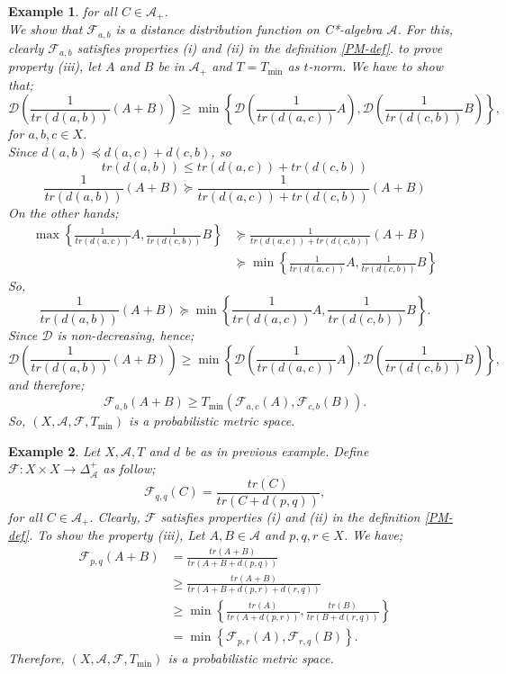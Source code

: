 \documentclass{amsart}%
\theoremstyle{plain}
\newtheorem{example}{Example}
\numberwithin{equation}{section}
\begin{document}
\begin{example}
	for all $C\in \mathcal{A}_+$.\\
	We show that $\mathcal{F}_{a,b}$ is a distance distribution function on C*-algebra $\mathcal{A}$. For this, clearly $\mathcal{F}_{a,b}$ satisfies properties (i) and (ii) in the definition \ref{PM-def}. to prove property (iii), let $A$ and $B$ be in $\mathcal{A}_+$ and $T=T_{\min}$ as $t$-norm. We have to show that;
	$$\mathcal{D}\left( \frac{1}{tr\left(d(a,b)\right)}(A+B)\right) \geq \min \left\{\mathcal{D}\left( \frac{1}{tr\left(d(a,c)\right)}A\right) , \mathcal{D}\left( \frac{1}{tr\left(d(c,b)\right)}B \right)\right\},  $$
	for $a,b,c\in X$.\\
	Since $d(a,b)\preceq d(a,c)+d(c,b)$, so
	$$tr\left( d(a,b)\right) \leq tr\left( d(a,c)\right) +tr\left( d(c,b)\right) $$
	$$\frac{1}{tr\left(d(a,b)\right)}(A+B)\succeq \frac{1}{tr\left( d(a,c)\right) +tr\left( d(c,b)\right)}(A+B)$$
	On the other hands;
	\begin{align*}
		\max\left\{\frac{1}{tr\left(d(a,c)\right)}A, \frac{1}{tr\left(d(c,b)\right)}B\right\} &\succeq \frac{1}{tr\left( d(a,c)\right) +tr\left( d(c,b)\right)}(A+B)\\
		&\succeq \min \left\{\frac{1}{tr\left(d(a,c)\right)}A, \frac{1}{tr\left(d(c,b)\right)}B\right\}
	\end{align*}
	So, 
	$$\frac{1}{tr\left(d(a,b)\right)}(A+B)\succeq \min \left\{\frac{1}{tr\left(d(a,c)\right)}A, \frac{1}{tr\left(d(c,b)\right)}B\right\}.$$
	Since $\mathcal{D}$ is non-decreasing, hence;
	$$\mathcal{D}\left( \frac{1}{tr\left(d(a,b)\right)}(A+B)\right) \geq \min \left\{\mathcal{D}\left( \frac{1}{tr\left(d(a,c)\right)}A\right) , \mathcal{D}\left( \frac{1}{tr\left(d(c,b)\right)}B \right)\right\}, $$
	and therefore;
	$$\mathcal{F}_{a,b}(A+B)\geq T_{\min}\left(\mathcal{F}_{a,c}(A),\mathcal{F}_{c,b}(B) \right).$$
	So, $(X, \mathcal{A}, \mathcal{F}, T_{\min})$ is a probabilistic metric space.
\end{example}

\begin{example}\label{Ex3}
	Let $X, \mathcal{A}, T$ and $d$ be as in previous example. Define $\mathcal{F}:X\times X \to \Delta^+_{\mathcal{A}}$ as follow;
	$$\mathcal{F}_{q,q}(C)=\frac{tr(C)}{tr\left( C+d(p,q)\right) },$$
	for all $C\in \mathcal{A}_+$.
	Clearly, $\mathcal{F}$ satisfies properties (i) and (ii) in the definition \ref{PM-def}. To show the property (iii), Let $A, B \in \mathcal{A}$ and $p, q, r \in X$. We have;
	\begin{align*}
		\mathcal{F}_{p,q}(A+B)&=\frac{tr(A+B)}{tr\left( A+B+d(p,q)\right)}\\
		&\geq \frac{tr(A+B)}{tr\left( A+B+d(p,r)+d(r,q)\right)}\\
		&\geq \min\left\{\frac{tr(A)}{tr\left( A+d(p,r)\right)}, \frac{tr(B)}{tr\left( B+d(r,q)\right)}\right\}\\
		&= \min\left\{\mathcal{F}_{p,r}(A), \mathcal{F}_{r,q}(B)\right\}.
	\end{align*}
	Therefore, $(X, \mathcal{A}, \mathcal{F}, T_{\min})$ is a probabilistic metric space.
\end{example}
\end{document}
